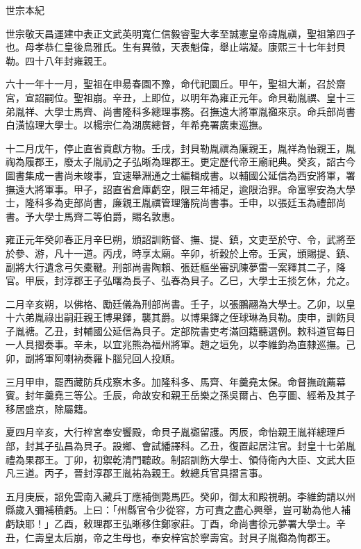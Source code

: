 
\begin{pinyinscope}
世宗本紀

世宗敬天昌運建中表正文武英明寬仁信毅睿聖大孝至誠憲皇帝諱胤禛，聖祖第四子也。母孝恭仁皇後烏雅氏。生有異徵，天表魁偉，舉止端凝。康熙三十七年封貝勒。四十八年封雍親王。

六十一年十一月，聖祖在申昜春園不豫，命代祀圜丘。甲午，聖祖大漸，召於齋宮，宣詔嗣位。聖祖崩。辛丑，上即位，以明年為雍正元年。命貝勒胤禩、皇十三弟胤祥、大學士馬齊、尚書隆科多總理事務。召撫遠大將軍胤禵來京。命兵部尚書白潢協理大學士。以楊宗仁為湖廣總督，年希堯署廣東巡撫。

十二月戊午，停止直省貢獻方物。壬戌，封貝勒胤禩為廉親王，胤祥為怡親王，胤祹為履郡王，廢太子胤礽之子弘晰為理郡王。更定歷代帝王廟祀典。癸亥，詔古今圖書集成一書尚未竣事，宜速舉淵通之士編輯成書。以輔國公延信為西安將軍，署撫遠大將軍事。甲子，詔直省倉庫虧空，限三年補足，逾限治罪。命富寧安為大學士，隆科多為吏部尚書，廉親王胤禩管理籓院尚書事。壬申，以張廷玉為禮部尚書。予大學士馬齊二等伯爵，賜名敦惠。

雍正元年癸卯春正月辛巳朔，頒詔訓飭督、撫、提、鎮，文吏至於守、令，武將至於參、游，凡十一道。丙戌，時享太廟。辛卯，祈穀於上帝。壬寅，頒賜提、鎮、副將大行遺念弓矢橐鞬。刑部尚書陶賴、張廷樞坐審訊陳夢雷一案釋其二子，降官。甲辰，封淳郡王子弘曙為長子、弘春為貝子。乙巳，大學士王掞乞休，允之。

二月辛亥朔，以佛格、勵廷儀為刑部尚書。壬子，以張鵬翮為大學士。乙卯，以皇十六弟胤祿出嗣莊親王博果鐸，襲其爵。以博果鐸之侄球琳為貝勒。庚申，訓飭貝子胤禟。乙丑，封輔國公延信為貝子。定部院書吏考滿回籍聽選例。敕科道官每日一人具摺奏事。辛未，以宜兆熊為福州將軍。趙之垣免，以李維鈞為直隸巡撫。己卯，副將軍阿喇衲奏羅卜腦兒回人投順。

三月甲申，罷西藏防兵戍察木多。加隆科多、馬齊、年羹堯太保。命督撫疏薦幕賓。封年羹堯三等公。壬辰，命故安和親王岳樂之孫吳爾占、色亨圖、經希及其子移居盛京，除屬籍。

夏四月辛亥，大行梓宮奉安饗殿，命貝子胤禵留護。丙辰，命怡親王胤祥總理戶部，封其子弘昌為貝子。設鄉、會試繙譯科。乙丑，復置起居注官。封皇十七弟胤禮為果郡王。丁卯，初禦乾清門聽政。制詔訓飭大學士、領侍衛內大臣、文武大臣凡三道。丙子，晉封淳郡王胤祐為親王。敕總兵官具摺言事。

五月庚辰，詔免雲南入藏兵丁應補倒斃馬匹。癸卯，御太和殿視朝。李維鈞請以州縣歲入彌補積虧。上曰：「州縣官令少從容，方可責之盡心興舉，豈可勒為他人補虧缺耶！」乙酉，敕理郡王弘晰移住鄭家莊。丁酉，命尚書徐元夢署大學士。辛丑，仁壽皇太后崩，帝之生母也，奉安梓宮於寧壽宮。封貝子胤禵為恂郡王。


\end{pinyinscope}
